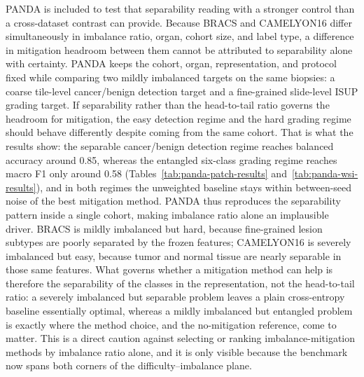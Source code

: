 \documentclass[11pt]{article}
\begin{document}
PANDA is included to test that separability reading with a stronger control than a cross-dataset contrast can provide. Because BRACS and CAMELYON16 differ simultaneously in imbalance ratio, organ, cohort size, and label type, a difference in mitigation headroom between them cannot be attributed to separability alone with certainty. PANDA keeps the cohort, organ, representation, and protocol fixed while comparing two mildly imbalanced targets on the same biopsies: a coarse tile-level cancer/benign detection target and a fine-grained slide-level ISUP grading target. If separability rather than the head-to-tail ratio governs the headroom for mitigation, the easy detection regime and the hard grading regime should behave differently despite coming from the same cohort. That is what the results show: the separable cancer/benign detection regime reaches balanced accuracy around \num{0.85}, whereas the entangled six-class grading regime reaches macro F1 only around \num{0.58} (Tables~\ref{tab:panda-patch-results} and~\ref{tab:panda-wsi-results}), and in both regimes the unweighted baseline stays within between-seed noise of the best mitigation method. PANDA thus reproduces the separability pattern inside a single cohort, making imbalance ratio alone an implausible driver. BRACS is mildly imbalanced but hard, because fine-grained lesion subtypes are poorly separated by the frozen features; CAMELYON16 is severely imbalanced but easy, because tumor and normal tissue are nearly separable in those same features. What governs whether a mitigation method can help is therefore the separability of the classes in the representation, not the head-to-tail ratio: a severely imbalanced but separable problem leaves a plain cross-entropy baseline essentially optimal, whereas a mildly imbalanced but entangled problem is exactly where the method choice, and the no-mitigation reference, come to matter. This is a direct caution against selecting or ranking imbalance-mitigation methods by imbalance ratio alone, and it is only visible because the benchmark now spans both corners of the difficulty--imbalance plane.
\end{document}
